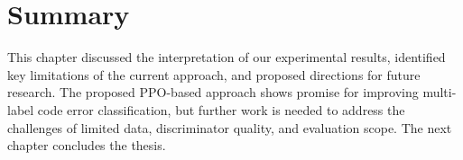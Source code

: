 \section{Summary}

This chapter discussed the interpretation of our experimental results, identified key limitations of the current approach, and proposed directions for future research. The proposed PPO-based approach shows promise for improving multi-label code error classification, but further work is needed to address the challenges of limited data, discriminator quality, and evaluation scope. The next chapter concludes the thesis.

\endgroup
\endinput
